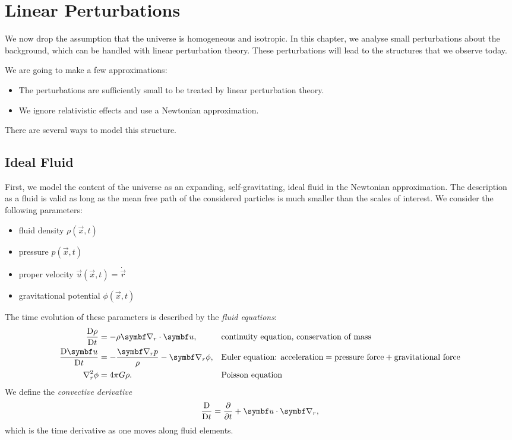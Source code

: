 \chapter{Linear Perturbations}

We now drop the assumption that the universe is homogeneous and isotropic. In this chapter, we analyse small perturbations about the background, which can be handled with linear perturbation theory. These perturbations will lead to the structures that we observe today.

We are going to make a few approximations:
\begin{itemize}[nolistsep,noitemsep]
	\item The perturbations are sufficiently small to be treated by linear perturbation theory.
	\item We ignore relativistic effects and use a Newtonian approximation.
\end{itemize}

There are several ways to model this structure.

\section{Ideal Fluid}
First, we model the content of the universe as an expanding, self-gravitating, ideal fluid in the Newtonian approximation. The description as a fluid is valid as long as the mean free path of the considered particles is much smaller than the scales of interest. We consider the following parameters:
\begin{itemize}[noitemsep]
	\item fluid density $\rho(\vec{x},t)$
	\item pressure $p(\vec{x},t)$
	\item proper velocity $\vec{u}(\vec{x},t) = \dot{\vec{r}}$
	\item gravitational potential $\phi(\vec{x},t)$
\end{itemize}
The time evolution of these parameters is described by the \emph{fluid equations}:
\begin{align*}
	\Dv{\rho}{t} &= - \rho \Grad_r \cdot \vec{u},
	&& \text{continuity equation, conservation of mass}\\
	\Dv{\vec{u}}{t} &= - \frac{\Grad_r p}{\rho} - \Grad_r \phi,
	&&\text{Euler equation: acceleration} = \text{pressure force} + \text{gravitational force}\\
	\Lap_r \phi &= 4 \pi G \rho.
	&&\text{Poisson equation}
\end{align*}
We define the \emph{convective derivative}
\begin{align*}
	\Dv{}{t} = \pdv{}{t} + \vec{u} \cdot \Grad_r,
\end{align*}
which is the time derivative as one moves along fluid elements.


